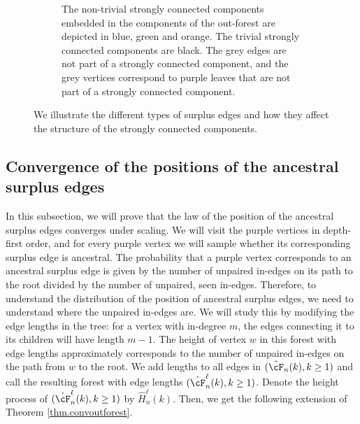 \begin{figure}
\begin{subfigure}{0.7\textwidth}
  \caption{The non-trivial strongly connected components embedded in the components of the out-forest are depicted in blue, green and orange. The trivial strongly connected components are black. The grey edges are not part of a strongly connected component, and the grey vertices correspond to purple leaves that are not part of a strongly connected component.}
    \label{subfigure.sccinexample}
\end{subfigure}
\caption{We illustrate the different types of surplus edges and how they affect the structure of the strongly connected components.}
\end{figure}

\subsection{Convergence of the positions of the ancestral surplus edges}\label{subsec.ancestral}
In this subsection, we will prove that the law of the position of the ancestral surplus edges converges under scaling. We will visit the purple vertices in depth-first order, and for every purple vertex we will sample whether its corresponding surplus edge is ancestral. The probability that a purple vertex corresponds to an ancestral surplus edge is given by the number of unpaired in-edges on its path to the root divided by the number of unpaired, seen in-edges. Therefore, to understand the distribution of the position of ancestral surplus edges, we need to understand where the unpaired in-edges are. We will study this by modifying the edge lengths in the tree: for a vertex with in-degree $m$, the edges connecting it to its children will have length $m-1$. The height of vertex $w$ in this forest with edge lengths approximately corresponds to the number of unpaired in-edges on the path from $w$ to the root. We add lengths to all edges in $(\hat{\cF}_n(k),k\geq 1)$ and call the resulting forest with edge lengths $(\hat{\cF}^\ell_n(k),k\geq 1)$. Denote the height process of $(\hat{\cF}^\ell_n(k),k\geq 1)$ by $\hat{H}_n^\ell(k)$. Then, we get the following extension of Theorem \ref{thm.convoutforest}.
